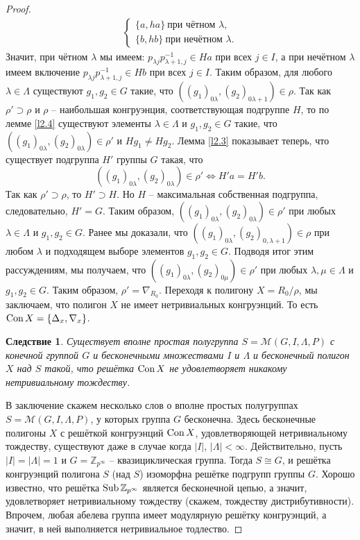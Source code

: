 \documentclass[a4paper]{article}
\newtheorem{corollary}{Следствие}
\newcommand{\Con}{\textnormal{Con}\, }
\newcommand{\Sub}{\textnormal{Sub}\, }
\begin{document}
\begin{proof}
\begin{gather*}
			\begin{cases}
				\{a, ha\} \ \text{при чётном $\lambda$},\\
				\{b, hb\}\ \text{при нечётном $\lambda$}.
			\end{cases}
		\end{gather*}
		Значит, при чётном $\lambda$ мы имеем: $p_{\lambda j} p_{\lambda+1,j}^{-1} \in Ha$ при всех $j \in I$, а при нечётном $\lambda$ имеем включение $p_{\lambda j} p_{\lambda+1,j}^{-1} \in Hb$ при всех $j \in I$. Таким образом, для любого $\lambda \in \Lambda$ существуют $g_1,g_2 \in G$ такие, что $((g_1)_{0 \lambda},(g_2)_{0 \lambda+1}) \in \rho$. Так как $\rho' \supset \rho$ и $\rho$ -- наибольшая конгруэнция, соответствующая подгруппе $H$, то по лемме \ref{l2.4} существуют элементы $\lambda \in \Lambda$ и $g_1,g_2 \in G$ такие, что $((g_1)_{0 \lambda},(g_2)_{0 \lambda}) \in \rho'$ и $Hg_1 \neq Hg_2$. Лемма \ref{l2.3} показывает теперь, что существует подгруппа $H'$ группы $G$ такая, что $$ ((g_1)_{0 \lambda},(g_2)_{0 \lambda}) \in \rho' \Leftrightarrow H'a = H'b. $$ Так как $\rho' \supset \rho$, то $H' \supset H$. Но $H$ -- максимальная собственная подгруппа, следовательно, $H' = G$. Таким образом, $((g_1)_{0 \lambda},(g_2)_{0 \lambda}) \in \rho'$ при любых $\lambda \in \Lambda$ и $g_1,g_2 \in G$. Ранее мы доказали, что $((g_1)_{0 \lambda},(g_2)_{0, \lambda+1}) \in \rho$ при любом $\lambda$ и подходящем выборе элементов $g_1,g_2 \in G$. Подводя итог этим рассуждениям, мы получаем, что $((g_1)_{0 \lambda},(g_2)_{0 \mu}) \in \rho'$ при любых $\lambda,\mu \in \Lambda$ и $g_1,g_2 \in G$. Таким образом, $\rho' = \nabla_{R_0}$. Переходя к полигону $X = {R_0}/{\rho}$, мы заключаем, что полигон $X$ не имеет нетривиальных конгруэнций. То есть $\Con X = \{ \Delta_x,\nabla_x \}$.
		
		\begin{corollary}
			Существует вполне простая полугруппа $S = \mathcal{M}(G,I,\Lambda,P)$ с конечной группой $G$ и бесконечными множествами $I$ и $\Lambda$ и бесконечный полигон $X$ над $S$ такой, что решётка $\Con X$ не удовлетворяет никакому нетривиальному тождеству. 
		\end{corollary}
		
		\par В заключение скажем несколько слов о вполне простых полугруппах $S = \mathcal{M}(G,I,\Lambda,P)$, у которых группа $G$ бесконечна. Здесь бесконечные полигоны $X$ с решёткой конгруэнций $\Con X$, удовлетворяющей нетривиальному тождеству, существуют даже в случае когда $|I|$, $|\Lambda| < \infty$. Действительно, пусть $|I| = |\Lambda| = 1$ и $G = \mathbb{Z}_{p^\infty}$ -- квазициклическая группа. Тогда $S \cong G$, и решётка конгруэнций полигона $S$ (над $S$) изоморфна решётке  подгрупп группы $G$. Хорошо известно, что решётка $\Sub \mathbb{Z}_{p^\infty}$ является бесконечной цепью, а значит, удовлетворяет нетривиальному тождеству (скажем, тождеству дистрибутивности). Впрочем, любая абелева группа имеет модулярную решётку конгруэнций, а значит, в ней выполняется нетривиальное тодлество.
	\end{proof}
	
	
\end{document}
